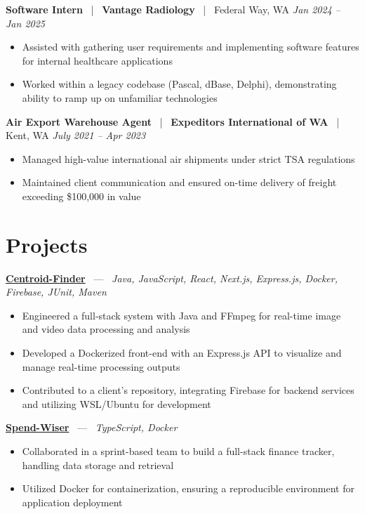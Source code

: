 \documentclass[10pt, letterpaper]{article}
\newcommand{\jobhead}[4]{%
  \vspace{5pt}%
  {\bfseries\color{dark}#1}%
  ~{\color{light}|}~%
  {\bfseries\color{navy}#2}%
  ~{\color{light}|}~%
  {\color{light}#3}%
  \hfill{\color{light}\small\textit{#4}}\\[-2pt]%
}
\newcommand{\projhead}[3]{%
  \vspace{5pt}%
  {\bfseries\color{dark}\href{#2}{#1}}%
  ~{\color{light}---}~%
  {\color{light}\small\textit{#3}}\\[-2pt]%
}
\begin{document}
\jobhead{Software Intern}{Vantage Radiology}{Federal Way, WA}{Jan 2024 – Jan 2025}
\begin{itemize}
  \item Assisted with gathering user requirements and implementing software features for internal healthcare applications
  \item Worked within a legacy codebase (Pascal, dBase, Delphi), demonstrating ability to ramp up on unfamiliar technologies
\end{itemize}

\jobhead{Air Export Warehouse Agent}{Expeditors International of WA}{Kent, WA}{July 2021 – Apr 2023}
\begin{itemize}
  \item Managed high-value international air shipments under strict TSA regulations
  \item Maintained client communication and ensured on-time delivery of freight exceeding \$100,000 in value
\end{itemize}

\section{Projects}

\projhead{Centroid-Finder}{https://github.com/xavierb117/centroid-finder}{Java, JavaScript, React, Next.js, Express.js, Docker, Firebase, JUnit, Maven}
\begin{itemize}
  \item Engineered a full-stack system with Java and FFmpeg for real-time image and video data processing and analysis
  \item Developed a Dockerized front-end with an Express.js API to visualize and manage real-time processing outputs
  \item Contributed to a client's repository, integrating Firebase for backend services and utilizing WSL/Ubuntu for development
\end{itemize}

\projhead{Spend-Wiser}{https://github.com/JesseChum/w26-sdev372-spendwiser-finance-tracker}{TypeScript, Docker}
\begin{itemize}
  \item Collaborated in a sprint-based team to build a full-stack finance tracker, handling data storage and retrieval
  \item Utilized Docker for containerization, ensuring a reproducible environment for application deployment
\end{itemize}
\end{document}
